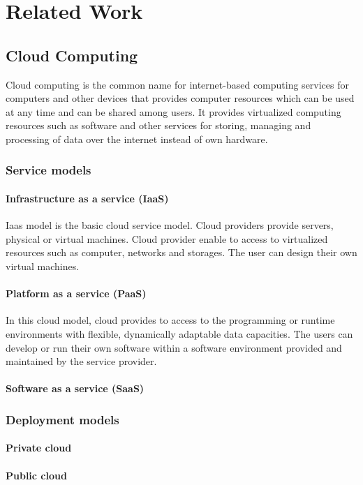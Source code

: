 \chapter{Related Work}
\label{cha:relatedwork}


\section{Cloud Computing}
Cloud computing is the common name for internet-based computing services for computers and other devices that provides computer resources which can be used at any time and can be shared among users.
It provides virtualized computing resources such as software and other services for storing, managing and processing of data over the internet instead of own hardware. 
\subsection{Service models}
\subsubsection{Infrastructure as a service (IaaS)}
Iaas model is the basic cloud service model. Cloud providers provide servers, physical or virtual machines.
Cloud provider enable to access to virtualized resources such as computer, networks and storages. The user can design their own virtual machines.  
\subsubsection{Platform as a service (PaaS)}

In this cloud model, cloud provides to access to the programming or runtime environments with flexible, dynamically adaptable data capacities. The users can develop or run their own software within a software environment provided and maintained by the service provider.  
\subsubsection{Software as a service (SaaS)}
\subsection{Deployment models}
\subsubsection{Private cloud}	
\subsubsection{Public cloud}	
